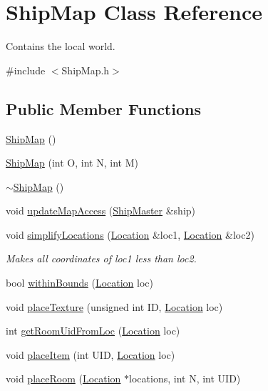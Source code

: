 \hypertarget{classShipMap}{\section{Ship\-Map Class Reference}
\label{classShipMap}
}


Contains the local world.  




{\ttfamily \#include $<$Ship\-Map.\-h$>$}

\subsection*{Public Member Functions}
\begin{DoxyCompactItemize}
\item 
\hyperlink{classShipMap_af52a69332839e08c8f4c6e24758f32da}{Ship\-Map} ()
\item 
\hyperlink{classShipMap_a0c3e21f65831db22a2c276f54b2584f7}{Ship\-Map} (int O, int N, int M)
\item 
\hyperlink{classShipMap_a82afc59f9e7ed5b8d208de36bab9236c}{$\sim$\-Ship\-Map} ()
\item 
void \hyperlink{classShipMap_a7c66418320a5bb788dbbe3a122e76cd7}{update\-Map\-Access} (\hyperlink{classShipMaster}{Ship\-Master} \&ship)
\item 
void \hyperlink{classShipMap_a2ff8a4864984373340f94eaed37debe7}{simplify\-Locations} (\hyperlink{structLocation}{Location} \&loc1, \hyperlink{structLocation}{Location} \&loc2)
\begin{DoxyCompactList}\small\item\em Makes all coordinates of loc1 less than loc2. \end{DoxyCompactList}\item 
bool \hyperlink{classShipMap_a6817875f83a1ae67fe9124823b80b4b1}{within\-Bounds} (\hyperlink{structLocation}{Location} loc)
\item 
void \hyperlink{classShipMap_a01d56312b189102d019a1da898957b73}{place\-Texture} (unsigned int I\-D, \hyperlink{structLocation}{Location} loc)
\item 
int \hyperlink{classShipMap_ae3df616ce12eb77874e27ae82331e131}{get\-Room\-Uid\-From\-Loc} (\hyperlink{structLocation}{Location} loc)
\item 
void \hyperlink{classShipMap_a7d2147c38abb30590644e2dbc3af94ea}{place\-Item} (int U\-I\-D, \hyperlink{structLocation}{Location} loc)
\item 
void \hyperlink{classShipMap_aa9c0f0f672b58f5ce32e2052432d5145}{place\-Room} (\hyperlink{structLocation}{Location} $\ast$locations, int N, int U\-I\-D)

\end{DoxyCompactItemize}
